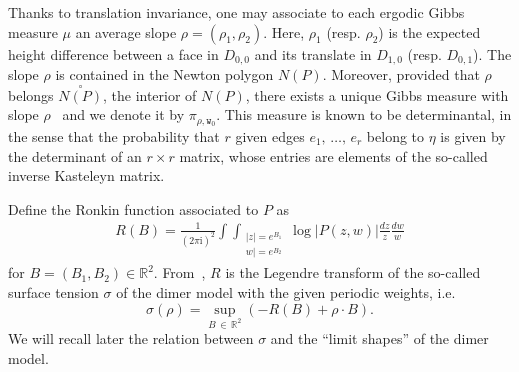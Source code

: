 \documentclass[10pt]{amsart}
\theoremstyle{definition}\newtheorem{defi}[theo]{Definition}\newtheorem{rema}[theo]{Remark}\newtheorem{exam}[theo]{Example}\newtheorem{exem}[theo]{Example}\newtheorem{nota}[theo]{Notation}
\newcommand{\ttw}{\mathtt{w}}
\newcommand{\bbR}{\mathbb{R}}
\newcommand{\rmi}{\mathrm{i}}
\begin{document}
Thanks to translation invariance, one may associate to each ergodic Gibbs measure $\mu$ an average slope $\rho=(\rho_1,\rho_2)$. Here, $\rho_1$ (resp. $\rho_2$) is the expected height difference between a face in $D_{0,0}$ and its translate in $D_{1,0}$ (resp. $D_{0,1}$). The slope $\rho$ is contained in the Newton polygon $N(P)$. Moreover, provided that $\rho$ belongs $\overset{\circ}{N(P)}$, the interior of $N(P)$, there exists a unique Gibbs measure with slope $\rho$~\cite{KOS03} and we denote it by $\pi_{\rho,\ttw_0}$. This measure is known to be determinantal, in the sense that the probability that $r$ given edges $e_1,\,\dots,\,e_r$ belong to $\eta$ is given by the determinant of an $r\times r$ matrix, whose entries are elements of the so-called inverse Kasteleyn matrix.

Define the Ronkin function associated to $P$ as
\begin{align}\label{eq:Ronkin}
R(B)= \frac{1}{(2\pi \rmi)^2} \int \int_{\substack{ |z|=e^{B_1} \\ 
w|=e^{B_2}}} \log |P(z,w)| \frac{dz}{z} \frac{dw}{w}
\end{align}
for $B=(B_1,B_2)\in\bbR^2$. From~\cite{KOS03}, $R$ is the Legendre transform of the so-called surface tension $\sigma$ of the dimer model with the given periodic weights, i.e.
\begin{equation}\label{eq:sigma}
\sigma(\rho)=\sup_{B\,\in\,\bbR^2}(-R(B)+\rho\cdot B).
\end{equation}
We will recall later the relation between $\sigma$ and the ``limit shapes'' of the dimer model.
\end{document}
